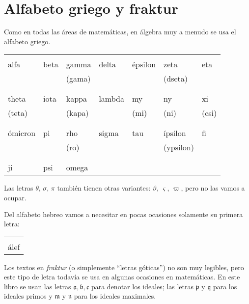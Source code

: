 \chapter{Alfabeto griego y fraktur}

\ifdefined\separatechapter\bookbanner\fi

Como en todas las áreas de matemáticas, en álgebra muy a menudo se usa el
alfabeto griego.

\begin{center}
  \noindent\begin{tabular}{x{1.5cm}x{1.5cm}x{1.5cm}x{1.5cm}x{1.5cm}x{1.5cm}x{1.5cm}}
     &  & \biglet{$\Gamma\gamma$} & \biglet{$\Delta\delta$} &  &  &  \tabularnewline
alfa & beta & gamma & delta & épsilon & zeta & eta \tabularnewline
    & & (gama) & & & (dseta) & \tabularnewline
    \tabularnewline
    \biglet{$\Theta\theta$} &  &  & \biglet{$\Lambda\lambda$} &  &  & \biglet{$\Xi\xi$} \tabularnewline
    theta & iota & kappa & lambda & my & ny & xi \tabularnewline
    (teta) & & (kapa) & & (mi) & (ni) & (csi) \tabularnewline
    \tabularnewline
     & \biglet{$\Pi\pi$} &  & \biglet{$\Sigma\sigma$} &  &  & \biglet{$\Phi\phi$} \tabularnewline
    ómicron & pi & rho & sigma & tau & ípsilon & fi \tabularnewline
    & & (ro)  & & & (ypsilon) \tabularnewline
    \tabularnewline
     & \biglet{$\Psi\psi$} & \biglet{$\Omega\omega$} & & & \tabularnewline
    ji & psi & omega & & & \tabularnewline
  \end{tabular}
\end{center}

Las letras $\theta$, $\sigma$, $\pi$ también tienen otras variantes:
$\vartheta$, $\varsigma$, $\varpi$, pero no las vamos a ocupar.

Del alfabeto hebreo vamos a necesitar en pocas ocasiones solamente su primera
letra:
\begin{center}
  \noindent\begin{tabular}{c}
    \biglet{$\aleph$} \tabularnewline
    álef \tabularnewline
  \end{tabular}
\end{center}

\pagebreak

Los textos en \emph{fraktur} (o simplemente ``letras góticas'') no son muy
legibles, pero este tipo de letra todavía se usa en algunas ocasiones en
matemáticas. En este libro se usan las letras
$\mathfrak{a}, \mathfrak{b}, \mathfrak{c}$ para denotar los ideales; las letras
$\mathfrak{p}$ y $\mathfrak{q}$ para los ideales primos y $\mathfrak{m}$ y
$\mathfrak{n}$ para los ideales maximales.

